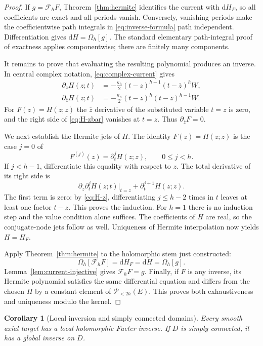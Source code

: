 \documentclass[11pt,a4paper]{article}
\numberwithin{equation}{section}
\newtheorem{corollary}[theorem]{Corollary}
\theoremstyle{definition}
\theoremstyle{remark}
\newcommand{\Fu}{\mathcal F_h}
\newcommand{\PP}{\mathscr P_{<2h}(E)}
\newcommand{\Om}{\Omega_h}
\newcommand{\barz}{\overline z}
\begin{document}
\begin{proof}
If $g=\Fu F$, Theorem~\ref{thm:hermite} identifies the current with
$\mathrm dH_F$, so all coefficients are exact and all periods vanish.
Conversely, vanishing periods make the coefficientwise path integrals in
\eqref{eq:inverse-formula} path independent. Differentiation gives
$\mathrm dH=\Om[g]$. The standard elementary path-integral proof of exactness
applies componentwise; there are finitely many components.

It remains to prove that evaluating the resulting polynomial produces an
inverse. In central complex notation, \eqref{eq:complex-current} gives
\begin{align}
 \partial_zH(z;t)&=-\frac{\kappa_h}{2}(t-z)^{h-1}(t-\barz)^hW,
 \label{eq:H-z}\\
 \partial_{\barz}H(z;t)&=-\frac{\kappa_h}{2}(t-z)^h(t-\barz)^{h-1}\overline W.
 \label{eq:H-zbar}
\end{align}
For $F(z)=H(z;z)$ the $\barz$ derivative of the substituted variable $t=z$
is zero, and the right side of \eqref{eq:H-zbar} vanishes at $t=z$.
Thus $\partial_{\barz}F=0$.

We next establish the Hermite jets of $H$. The identity
$F(z)=H(z;z)$ is the case $j=0$ of
\begin{equation}\label{eq:reconstructed-jets}
 F^{(j)}(z)=\partial_t^jH(z;z),\qquad 0\le j<h.
\end{equation}
If $j<h-1$, differentiate this equality with respect to $z$. The total
derivative of its right side is
\[
 \partial_z\partial_t^jH(z;t)\big|_{t=z}
 +\partial_t^{j+1}H(z;z).
\]
The first term is zero: by \eqref{eq:H-z}, differentiating $j\le h-2$ times
in $t$ leaves at least one factor $t-z$. This proves the induction. For
$h=1$ there is no induction step and the value condition alone suffices.
The coefficients of $H$ are real, so the conjugate-node jets follow as well.
Uniqueness of Hermite interpolation now yields $H=H_F$.

Apply Theorem~\ref{thm:hermite} to the holomorphic stem just constructed:
\[
 \Om[\Fu F]=\mathrm dH_F=\mathrm dH=\Om[g].
\]
Lemma~\ref{lem:current-injective} gives $\Fu F=g$. Finally, if $F$ is any
inverse, its Hermite polynomial satisfies the same differential equation and
differs from the chosen $H$ by a constant element of $\PP$. This proves
both exhaustiveness and uniqueness modulo the kernel.
\end{proof}

\begin{corollary}[Local inversion and simply connected domains]
Every smooth axial target has a local holomorphic Fueter inverse. If $D$ is
simply connected, it has a global inverse on $D$.
\end{corollary}
\end{document}
